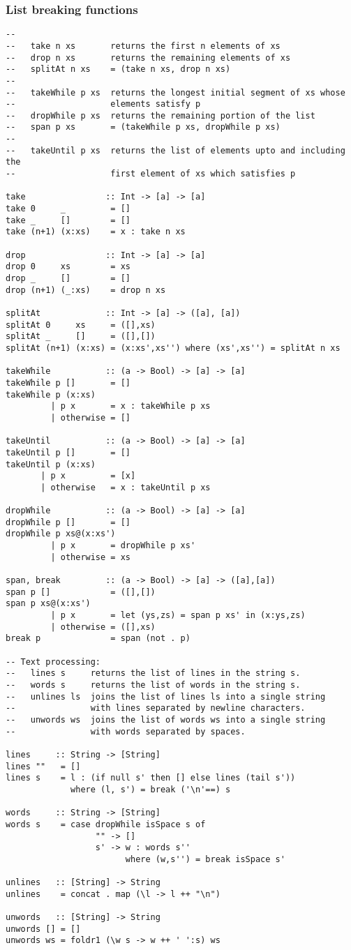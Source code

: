 \subsubsection*{List breaking functions}
\begin{verbatim}
--
--   take n xs       returns the first n elements of xs
--   drop n xs       returns the remaining elements of xs
--   splitAt n xs    = (take n xs, drop n xs)
--
--   takeWhile p xs  returns the longest initial segment of xs whose
--                   elements satisfy p
--   dropWhile p xs  returns the remaining portion of the list
--   span p xs       = (takeWhile p xs, dropWhile p xs)
--
--   takeUntil p xs  returns the list of elements upto and including the
--                   first element of xs which satisfies p

take                :: Int -> [a] -> [a]
take 0     _         = []
take _     []        = []
take (n+1) (x:xs)    = x : take n xs

drop                :: Int -> [a] -> [a]
drop 0     xs        = xs
drop _     []        = []
drop (n+1) (_:xs)    = drop n xs

splitAt             :: Int -> [a] -> ([a], [a])
splitAt 0     xs     = ([],xs)
splitAt _     []     = ([],[])
splitAt (n+1) (x:xs) = (x:xs',xs'') where (xs',xs'') = splitAt n xs

takeWhile           :: (a -> Bool) -> [a] -> [a]
takeWhile p []       = []
takeWhile p (x:xs)
         | p x       = x : takeWhile p xs
         | otherwise = []

takeUntil           :: (a -> Bool) -> [a] -> [a]
takeUntil p []       = []
takeUntil p (x:xs)
       | p x         = [x]
       | otherwise   = x : takeUntil p xs

dropWhile           :: (a -> Bool) -> [a] -> [a]
dropWhile p []       = []
dropWhile p xs@(x:xs')
         | p x       = dropWhile p xs'
         | otherwise = xs

span, break         :: (a -> Bool) -> [a] -> ([a],[a])
span p []            = ([],[])
span p xs@(x:xs')
         | p x       = let (ys,zs) = span p xs' in (x:ys,zs)
         | otherwise = ([],xs)
break p              = span (not . p)

-- Text processing:
--   lines s     returns the list of lines in the string s.
--   words s     returns the list of words in the string s.
--   unlines ls  joins the list of lines ls into a single string
--               with lines separated by newline characters.
--   unwords ws  joins the list of words ws into a single string
--               with words separated by spaces.

lines     :: String -> [String]
lines ""   = []
lines s    = l : (if null s' then [] else lines (tail s'))
             where (l, s') = break ('\n'==) s

words     :: String -> [String]
words s    = case dropWhile isSpace s of
                  "" -> []
                  s' -> w : words s''
                        where (w,s'') = break isSpace s'

unlines   :: [String] -> String
unlines    = concat . map (\l -> l ++ "\n")

unwords   :: [String] -> String
unwords [] = []
unwords ws = foldr1 (\w s -> w ++ ' ':s) ws
\end{verbatim}
